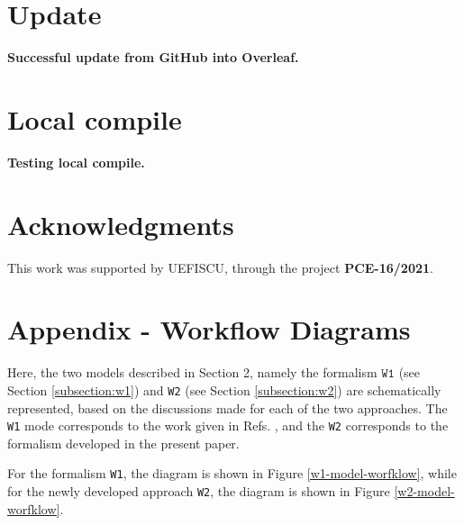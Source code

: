 \documentclass[11pt]{article}
\begin{document}
\section{Update}

\textbf{Successful update from GitHub into Overleaf.}

\section{Local compile}

\textbf{Testing local compile.}

\section*{Acknowledgments}
This work was supported by UEFISCU, through the project \textbf{PCE-16/2021}.

\appendix
\section{Appendix - Workflow Diagrams}
Here, the two models described in Section 2, namely the formalism $\texttt{W1}$ (see Section \ref{subsection:w1}) and \texttt{W2} (see Section \ref{subsection:w2}) are schematically represented, based on the discussions made for each of the two approaches. The \texttt{W1} mode corresponds to the work given in Refs. \cite{raduta2020approach,raduta2020towards}, and the \texttt{W2} corresponds to the formalism developed in the present paper. 

For the formalism \texttt{W1}, the diagram is shown in Figure \ref{w1-model-worfklow}, while for the newly developed approach \texttt{W2}, the diagram is shown in Figure \ref{w2-model-worfklow}.
\end{document}
